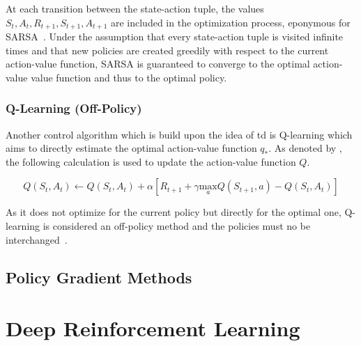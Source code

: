 \documentclass[draft,final]{vutinfth} %
\begin{document}
    At each transition between the state-action tuple, the values $S_{t},A_{t},R_{t+1},S_{t+1},A_{t+1}$ are included in the optimization process, eponymous for SARSA~\citep{sutton_reinforcement_2018}.
    Under the assumption that every state-action tuple is visited infinite times and that new policies are created greedily with respect to the current action-value function, SARSA is guaranteed to converge to the optimal action-value value function and thus to the optimal policy.



    \subsection{Q-Learning (Off-Policy)}\label{subsec:q-learningnulloff-policynull}

    Another control algorithm which is build upon the idea of \gls{td} is Q-learning which aims to directly estimate the optimal action-value function $q_*$.
    As denoted by \citeauthor{watkins_q-learning_1992}, the following calculation is used to update the action-value function $Q$.

    \begin{equation}
        Q(S_t,A_t) \leftarrow Q(S_t,A_t) + \alpha [R_{t+1} + \gamma \underset{a}{\text{max}} Q(S_{t+1},a) - Q(S_{t},A_{t}) ]
    \end{equation}

    As it does not optimize for the current policy but directly for the optimal one, Q-learning is considered an off-policy method and the policies must no be interchanged~\citep{szepesvari_algorithms_2010}.



    \section{Policy Gradient Methods}




    \chapter{Deep Reinforcement Learning}\label{ch:deep-reinforcement-learning}
\end{document}
